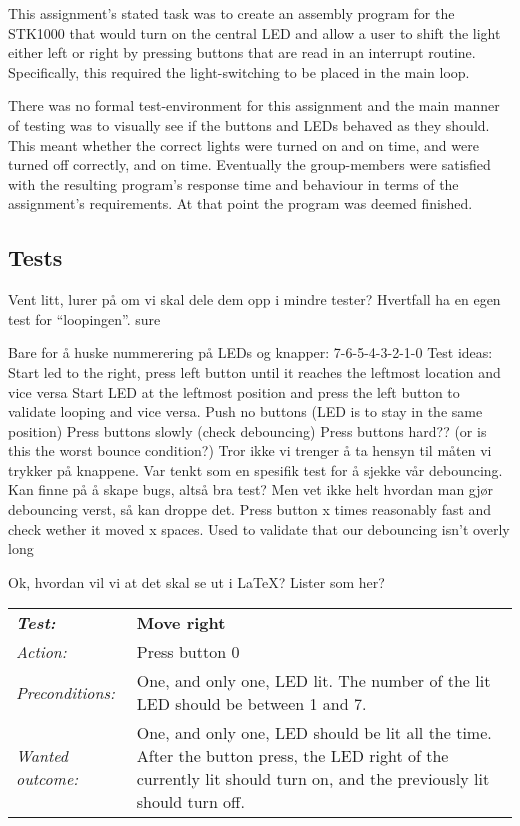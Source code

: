 This assignment’s stated task was to create an assembly program for the STK1000 that would turn on the central LED and allow a user to shift the light either left or right by pressing buttons that are read in an interrupt routine. Specifically, this required the light-switching to be placed in the main loop.

There was no formal test-environment for this assignment and the main manner of testing was to visually see if the buttons and LEDs behaved as they should. This meant whether the correct lights were turned on and on time, and were turned off correctly, and on time. 
Eventually the group-members were satisfied with the resulting program’s response time and behaviour in terms of the assignment’s requirements. At that point the program was deemed finished.

\subsection{Tests}
Vent litt, lurer på om vi skal dele dem opp i mindre tester? Hvertfall ha en egen test for “loopingen”. sure

Bare for å huske nummerering på LEDs og knapper:
7-6-5-4-3-2-1-0
Test ideas:
Start led to the right, press left button until it reaches the leftmost location and vice versa
Start LED at the leftmost position and press the left button to validate looping and vice versa.
Push no buttons (LED is to stay in the same position)
Press buttons slowly (check debouncing)
Press buttons hard?? (or is this the worst bounce condition?)
Tror ikke vi trenger å ta hensyn til måten vi trykker på knappene. Var tenkt som en spesifik test for å sjekke vår debouncing. Kan finne på å skape bugs, altså bra test? Men vet ikke helt hvordan man gjør debouncing verst, så kan droppe det.
Press button x times reasonably fast and check wether it moved x spaces. Used to validate that our debouncing isn’t overly long

Ok, hvordan vil vi at det skal se ut i LaTeX? Lister som her?







\begin{tabular}[h]{lp{12cm}} \hline
\textbf{\emph{Test:}} 		& \textbf{Move right}\\
\emph{Action:} 		& Press button 0\\
\emph{Preconditions:}	& One, and only one, LED lit. The number of the lit LED should be between 1 and 7.\\
\emph{Wanted outcome:}	& One, and only one, LED should be lit all the time. After the button press, the LED right of the currently lit should turn on, and the previously lit should turn off.\\ \hline
\end{tabular}


